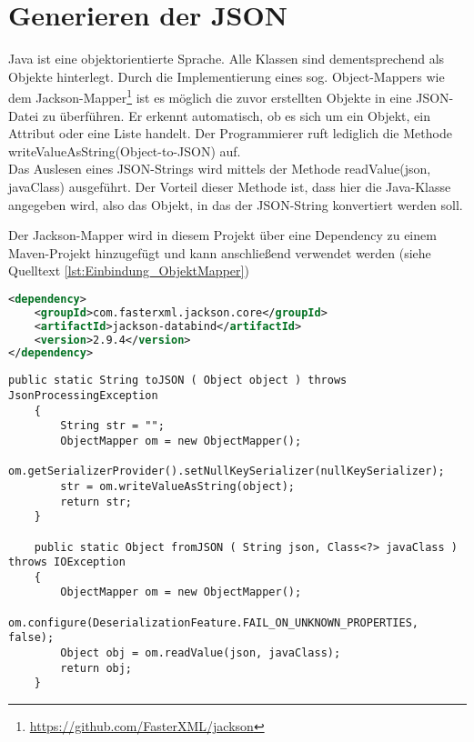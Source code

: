 \section{Generieren der \acf{JSON}}
\label{sec:json_generieren}
\authorsection{\authorSG}

Java ist eine objektorientierte Sprache.
Alle Klassen sind dementsprechend als Objekte hinterlegt.
Durch die Implementierung eines sog. Object-Mappers wie dem Jackson-Mapper\footnote{\url{https://github.com/FasterXML/jackson}}
ist es möglich die zuvor erstellten Objekte in eine \acs{JSON}-Datei zu überführen.
Er erkennt automatisch, ob es sich um ein Objekt, ein Attribut oder eine Liste handelt.
Der Programmierer ruft lediglich die Methode writeValueAsString(Object-to-JSON) auf. \\
Das Auslesen eines \acs{JSON}-Strings wird mittels der Methode readValue(json, javaClass) ausgeführt.
Der Vorteil dieser Methode ist, dass hier die Java-Klasse angegeben wird, also das Objekt, in das der \acs{JSON}-String konvertiert werden soll.

Der Jackson-Mapper wird in diesem Projekt über eine Dependency zu einem Maven-Projekt hinzugefügt und kann anschließend verwendet werden (siehe Quelltext \ref{lst:Einbindung_ObjektMapper}) %

\begin{minipage}{\linewidth}
\begin{lstlisting}[language=XML]
<dependency>
	<groupId>com.fasterxml.jackson.core</groupId>
	<artifactId>jackson-databind</artifactId>
	<version>2.9.4</version>
</dependency>
\end{lstlisting}
\label{lst:Einbindung_ObjektMapper}
\end{minipage}

\begin{minipage}{\linewidth}
	\begin{lstlisting}[style=lstJava]
	public static String toJSON ( Object object ) throws JsonProcessingException
	{
		String str = "";
		ObjectMapper om = new ObjectMapper();
		om.getSerializerProvider().setNullKeySerializer(nullKeySerializer);
		str = om.writeValueAsString(object);
		return str;
	}
	
	public static Object fromJSON ( String json, Class<?> javaClass ) throws IOException
	{
		ObjectMapper om = new ObjectMapper();
		om.configure(DeserializationFeature.FAIL_ON_UNKNOWN_PROPERTIES, false);
		Object obj = om.readValue(json, javaClass);
		return obj;
	}
	\end{lstlisting}
\end{minipage}